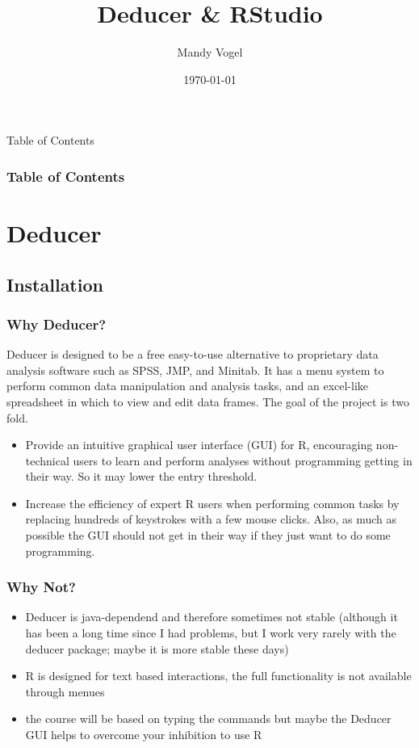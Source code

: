 \documentclass[xcolor={table}]{beamer}
\begin{document}
\title{Deducer \& RStudio}   
\author{Mandy Vogel} 
\date{\today}


\begin{frame}
\titlepage
\end{frame}

\begin{frame}{Table of Contents}
\frametitle{Table of Contents}\tableofcontents
\end{frame}

\section{Deducer}
\subsection{Installation}

\begin{frame}\frametitle{Why Deducer?}
Deducer is designed to be a free easy-to-use alternative to proprietary data analysis software such as SPSS, JMP, and Minitab. It has a menu system to perform common data manipulation and analysis tasks, and an excel-like spreadsheet in which to view and edit data frames. The goal of the project is two fold.
\begin{itemize}
\item Provide an intuitive graphical user interface (GUI) for R, encouraging non-technical users to learn and perform analyses without programming getting in their way. So it may lower the entry threshold.
\item Increase the efficiency of expert R users when performing common tasks by replacing hundreds of keystrokes with a few mouse clicks. Also, as much as possible the GUI should not get in their way if they just want to do some programming. 
  \end{itemize}
\end{frame}

\begin{frame}\frametitle{Why Not?}
\begin{itemize}
\item Deducer is java-dependend and therefore sometimes not stable (although it has been a long time since I had problems, but I work very rarely with the deducer package; maybe it is more stable these days)
\item R is designed for text based interactions, the full functionality is not available through menues
\item the course will be based on typing the commands but maybe the Deducer GUI helps to overcome your inhibition to use R
  \end{itemize}
\end{frame}
\end{document}
